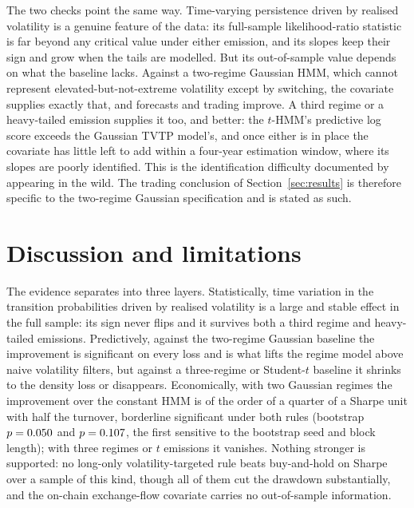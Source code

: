 \documentclass[11pt,a4paper]{article}
\begin{document}
The two checks point the same way. Time-varying persistence driven by realised volatility is a genuine feature of the data: its full-sample likelihood-ratio statistic is far beyond any critical value under either emission, and its slopes keep their sign and grow when the tails are modelled. But its out-of-sample value depends on what the baseline lacks. Against a two-regime Gaussian HMM, which cannot represent elevated-but-not-extreme volatility except by switching, the covariate supplies exactly that, and forecasts and trading improve. A third regime or a heavy-tailed emission supplies it too, and better: the $t$-HMM's predictive log score exceeds the Gaussian TVTP model's, and once either is in place the covariate has little left to add within a four-year estimation window, where its slopes are poorly identified. This is the identification difficulty documented by \citet{modee2026} appearing in the wild. The trading conclusion of Section~\ref{sec:results} is therefore specific to the two-regime Gaussian specification and is stated as such.

\section{Discussion and limitations}\label{sec:discussion}
The evidence separates into three layers. Statistically, time variation in the transition probabilities driven by realised volatility is a large and stable effect in the full sample: its sign never flips and it survives both a third regime and heavy-tailed emissions. Predictively, against the two-regime Gaussian baseline the improvement is significant on every loss and is what lifts the regime model above naive volatility filters, but against a three-regime or Student-$t$ baseline it shrinks to the density loss or disappears. Economically, with two Gaussian regimes the improvement over the constant HMM is of the order of a quarter of a Sharpe unit with half the turnover, borderline significant under both rules (bootstrap $p=0.050$ and $p=0.107$, the first sensitive to the bootstrap seed and block length); with three regimes or $t$ emissions it vanishes. Nothing stronger is supported: no long-only volatility-targeted rule beats buy-and-hold on Sharpe over a sample of this kind, though all of them cut the drawdown substantially, and the on-chain exchange-flow covariate carries no out-of-sample information.
\end{document}
